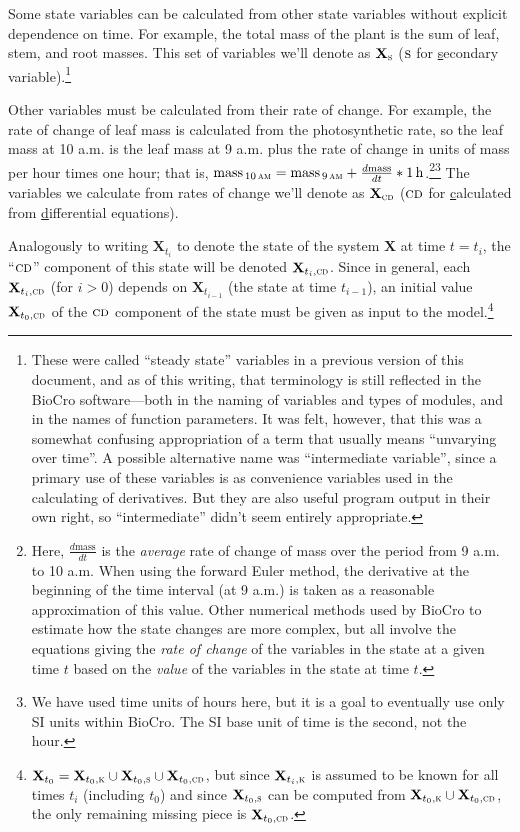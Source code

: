 \documentclass{article}
\newcommand{\boldX}{\mathbf{X}}
\newcommand{\cd}{\textsc{cd}}
\newcommand{\kn}{\textsc{k}} %
\newcommand{\s}{\textsc{s}} %
\begin{document}
Some state variables can be calculated from other state variables
without explicit dependence on time. For example, the total mass of
the plant is the sum of leaf, stem, and root masses.  This set of
variables we'll denote as $\boldX_\s$ ({$\s$} for
\underline{s}econdary variable).\footnote{These were called ``steady
  state'' variables in a previous version of this document, and as of
  this writing, that terminology is still reflected in the BioCro
  software---both in the naming of variables and types of modules, and
  in the names of function parameters.  It was felt, however, that
  this was a somewhat confusing appropriation of a term that usually
  means ``unvarying over time''.  A possible alternative name was
  ``intermediate variable'', since a primary use of these variables is
  as convenience variables used in the calculating of derivatives.
  But they are also useful program output in their own right, so
  ``intermediate'' didn't seem entirely appropriate.}

Other variables must be calculated from their rate of change. For
example, the rate of change of leaf mass is calculated from the
photosynthetic rate, so the leaf mass at 10 a.m. is the leaf mass at 9
a.m. plus the rate of change in units of mass per hour times one hour;
that is, $\mathrm{mass}_\text{\,10\,\textsc{am}} =
\mathrm{mass}_\text{\,9\,\textsc{am}} + \frac{d\mathrm{mass}}{dt} *
\SI{1}{h}$.\footnote{Here, $\frac{d\mathrm{mass}}{dt}$ is the
  \emph{average} rate of change of mass over the period from 9 a.m. to
  10 a.m.  When using the forward Euler method, the derivative at the
  beginning of the time interval (at 9 a.m.) is taken as a reasonable
  approximation of this value.  Other numerical methods used by BioCro
  to estimate how the state changes are more complex, but all involve
  the equations giving the \emph{rate of change} of the variables in
  the state at a given time $t$ based on the \emph{value} of the
  variables in the state at time $t$.}\footnote{We have used time units of
  hours here, but it is a goal to eventually use only SI units within
  BioCro.  The SI base unit of time is the second, not the hour.} The
variables we calculate from rates of change we'll denote as
$\boldX_\cd$ ($\cd$ for \underline{c}alculated from
\underline{d}ifferential equations).


Analogously to writing $\boldX_{t_i}$ to denote the state of the
system $\boldX$ at time $t = t_i$, the ``$\cd$'' component of this
state will be denoted $\boldX_{t_i, \cd}$.  Since in general, each
$\boldX_{t_i, \cd}$ (for $i > 0$) depends on $\boldX_{t_{i-1}}$ (the
state at time $t_{i-1}$), an initial value $\boldX_{t_0, \cd}$ of the
$\cd$ component of the state must be given as input to the
model.\footnote{$\boldX_{t_0} = \boldX_{t_0, \kn} \cup \boldX_{t_0,
    \s} \cup \boldX_{t_0, \cd}$, but since $\boldX_{t_i, \kn}$ is
  assumed to be known for all times $t_i$ (including $t_0$) and since
  $\boldX_{t_0, \s}$ can be computed from $\boldX_{t_0, \kn} \cup
  \boldX_{t_0, \cd}$, the only remaining missing piece is
  $\boldX_{t_0, \cd}$.}
\end{document}
